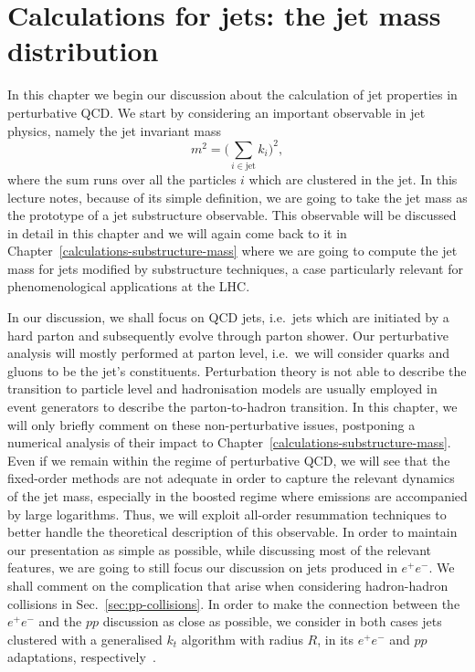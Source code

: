 %
\chapter{Calculations for jets: the jet mass distribution}\label{chap:calculations-jets}
%
In this chapter we begin our discussion about the calculation of jet properties in perturbative QCD.
%
We start by considering  an important observable in jet physics, namely the jet invariant mass
\begin{equation}\label{eq:jet-mass-def}
m^2=\bigg( \sum_{i \in \text{jet}}k_i\bigg)^2,
\end{equation}
where the sum runs over all the particles $i$ which are clustered in the jet. 
%
In this lecture notes, because of its simple definition, we are going to take the jet mass as the prototype of a jet substructure observable.
%
This observable will be discussed in detail in this
  chapter and we will again come back to it in
  Chapter~\ref{calculations-substructure-mass} where we are going to compute the jet
  mass for jets modified by substructure techniques, a case
  particularly relevant for phenomenological applications at the
  LHC.

In our discussion, we shall focus on QCD jets, i.e.\ jets which are initiated by a hard parton and subsequently evolve through parton shower. 
%
%
Our perturbative analysis will mostly performed at parton level, i.e.\
we will consider quarks and gluons to be the jet's
constituents. Perturbation theory is not able to describe the
transition to particle level and hadronisation models are usually
employed in event generators to describe the parton-to-hadron
transition.  In this chapter, we will only briefly comment on these
non-perturbative issues, postponing a numerical analysis of their impact to Chapter~\ref{calculations-substructure-mass}.
%
Even if we remain within the regime of perturbative QCD, we will see
that the fixed-order methods are not adequate in order to capture the
relevant dynamics of the jet mass, especially in the boosted regime
where emissions are accompanied by large logarithms. Thus, we will
exploit all-order resummation techniques to better handle the theoretical description of this observable.
%
%
In order to maintain our presentation as simple as possible, while discussing most of the relevant features, we are going to still focus our discussion on jets produced in $e^+e^-$. 
%
We shall comment on the complication that arise when considering hadron-hadron collisions in Sec.~\ref{sec:pp-collisions}.
%
In order to make the connection between the $e^+e^-$ and the $pp$ discussion as close as possible, we consider in both cases jets clustered with a generalised $k_t$ algorithm with radius $R$, in its $e^+e^-$ and $pp$ adaptations, respectively~\cite{Cacciari:2011ma}.

